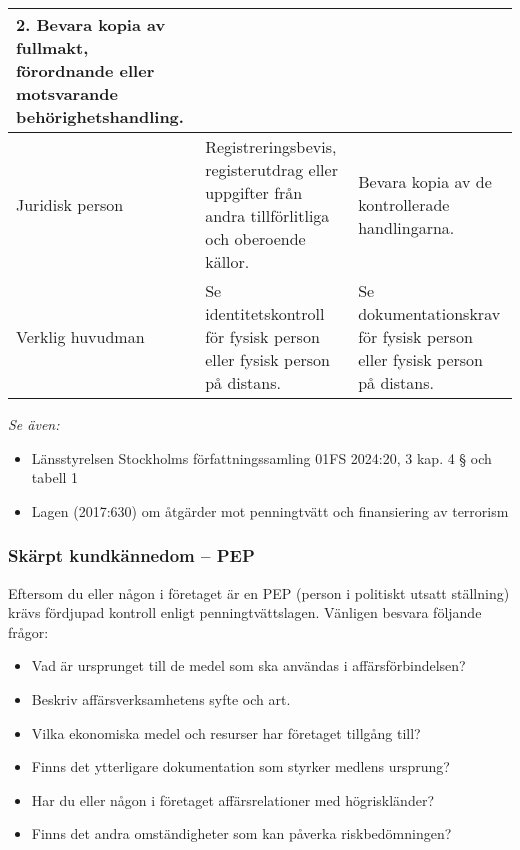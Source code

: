 \documentclass[10pt]{beamer}
\begin{document}
\begin{frame}[label=kontrolltabell]
\begin{tabular}{|p{2.8cm}|p{5.2cm}|p{5.2cm}|}
    2. Bevara kopia av fullmakt, förordnande eller motsvarande behörighetshandling. \\
    \hline
    Juridisk person &
    Registreringsbevis, registerutdrag eller uppgifter från andra tillförlitliga och oberoende källor. &
    Bevara kopia av de kontrollerade handlingarna. \\
    \hline
    Verklig huvudman &
    Se identitetskontroll för fysisk person eller fysisk person på distans. &
    Se dokumentationskrav för fysisk person eller fysisk person på distans. \\
    \hline
  \end{tabular}
  \vspace{0.3cm}
  \footnotesize
  \textit{Se även:}
  \begin{itemize}
    \item Länsstyrelsen Stockholms författningssamling 01FS 2024:20, 3 kap. 4 § och tabell 1
    \item Lagen (2017:630) om åtgärder mot penningtvätt och finansiering av terrorism
  \end{itemize}
\end{frame}



  \begin{frame}[label=pepfordjupning]
    \frametitle{Skärpt kundkännedom – PEP}

    \small
    Eftersom du eller någon i företaget är en PEP (person i politiskt utsatt ställning) krävs fördjupad kontroll enligt penningtvättslagen. Vänligen besvara följande frågor:
    \begin{itemize}
      \item Vad är ursprunget till de medel som ska användas i affärsförbindelsen?
      \item Beskriv affärsverksamhetens syfte och art.
      \item Vilka ekonomiska medel och resurser har företaget tillgång till?
      \item Finns det ytterligare dokumentation som styrker medlens ursprung?
      \item Har du eller någon i företaget affärsrelationer med högriskländer?
      \item Finns det andra omständigheter som kan påverka riskbedömningen?
    \end{itemize}

    \vspace{0.8cm}
    \begin{flushright}
      \hyperlink{nextslide}{}
    \end{flushright}
  \end{frame}
\end{document}
